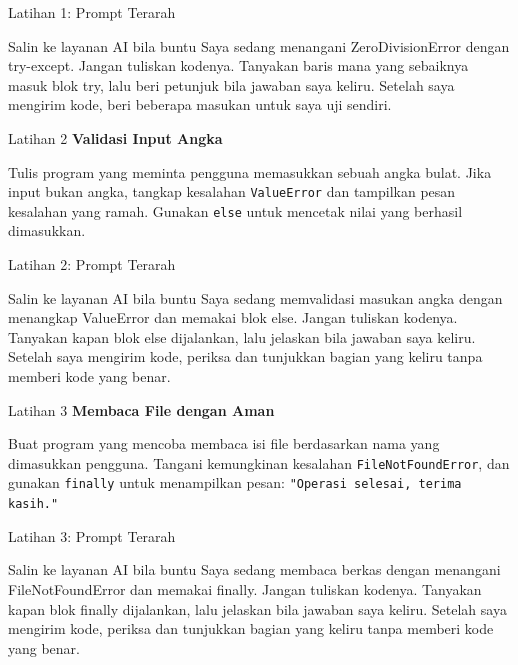 \documentclass[aspectratio=169, table]{beamer}
\begin{document}
\begin{frame}{Latihan 1: Prompt Terarah}
\begin{block}{Salin ke layanan AI bila buntu}
\small Saya sedang menangani ZeroDivisionError dengan try-except. Jangan tuliskan kodenya. Tanyakan baris mana yang sebaiknya masuk blok try, lalu beri petunjuk bila jawaban saya keliru. Setelah saya mengirim kode, beri beberapa masukan untuk saya uji sendiri.
\end{block}
\end{frame}

\begin{frame}[fragile,allowframebreaks=0.8]{Latihan 2}
\footnotesize
\textbf{Validasi Input Angka}\par\medskip
Tulis program yang meminta pengguna memasukkan sebuah angka bulat.  
    Jika input bukan angka, tangkap kesalahan \texttt{ValueError} dan tampilkan pesan kesalahan yang ramah.  
    Gunakan \texttt{else} untuk mencetak nilai yang berhasil dimasukkan.
\end{frame}

\begin{frame}{Latihan 2: Prompt Terarah}
\begin{block}{Salin ke layanan AI bila buntu}
\small Saya sedang memvalidasi masukan angka dengan menangkap ValueError dan memakai blok else. Jangan tuliskan kodenya. Tanyakan kapan blok else dijalankan, lalu jelaskan bila jawaban saya keliru. Setelah saya mengirim kode, periksa dan tunjukkan bagian yang keliru tanpa memberi kode yang benar.
\end{block}
\end{frame}

\begin{frame}[fragile,allowframebreaks=0.8]{Latihan 3}
\footnotesize
\textbf{Membaca File dengan Aman}\par\medskip
Buat program yang mencoba membaca isi file berdasarkan nama yang dimasukkan pengguna.  
    Tangani kemungkinan kesalahan \texttt{FileNotFoundError}, dan gunakan \texttt{finally} untuk menampilkan pesan:  
    \texttt{"Operasi selesai, terima kasih."}
\end{frame}

\begin{frame}{Latihan 3: Prompt Terarah}
\begin{block}{Salin ke layanan AI bila buntu}
\small Saya sedang membaca berkas dengan menangani FileNotFoundError dan memakai finally. Jangan tuliskan kodenya. Tanyakan kapan blok finally dijalankan, lalu jelaskan bila jawaban saya keliru. Setelah saya mengirim kode, periksa dan tunjukkan bagian yang keliru tanpa memberi kode yang benar.
\end{block}
\end{frame}
\end{document}
